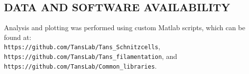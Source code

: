 \subsection{DATA AND SOFTWARE AVAILABILITY}
Analysis and plotting was performed using custom Matlab scripts, which can be found at: \\
\texttt{https://github.com/TansLab/Tans\_Schnitzcells}, \\ 
\texttt{https://github.com/TansLab/Tans\_filamentation}, and \\
\texttt{https://github.com/TansLab/Common\_libraries}.






